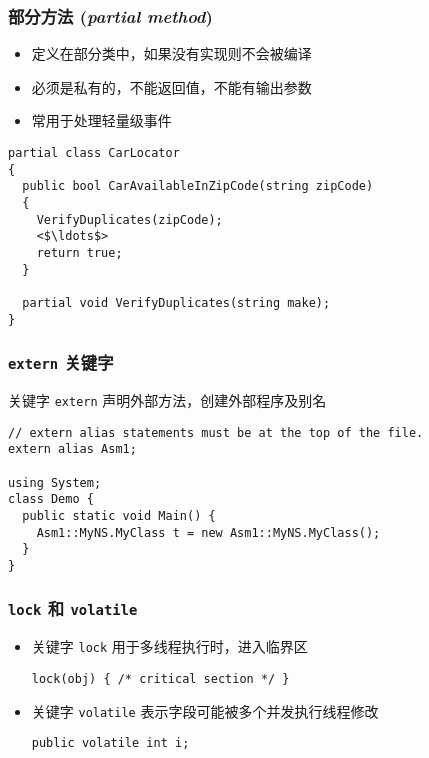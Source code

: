 \begin{frame}[fragile]
\frametitle{部分方法 (\textit{partial method})}
\begin{itemize}
\item 定义在部分类中，如果没有实现则不会被编译
\item 必须是私有的，不能返回值，不能有输出参数
\item 常用于处理轻量级事件
\end{itemize}
\begin{lstlisting}[escapeinside=<>]
partial class CarLocator
{
  public bool CarAvailableInZipCode(string zipCode)
  {
    VerifyDuplicates(zipCode);
    <$\ldots$>
    return true;
  }

  partial void VerifyDuplicates(string make);
}
\end{lstlisting}
\end{frame}


\begin{frame}[fragile]
\frametitle{\texttt{extern} 关键字}
关键字 \texttt{extern} 声明外部方法，创建外部程序及别名

\begin{lstlisting}
// extern alias statements must be at the top of the file.
extern alias Asm1;

using System;
class Demo {
  public static void Main() {
    Asm1::MyNS.MyClass t = new Asm1::MyNS.MyClass();
  }
}
\end{lstlisting}

\end{frame}

\begin{frame}[fragile]
\frametitle{\texttt{lock} 和 \texttt{volatile}}
\begin{itemize}
\item 关键字 \texttt{lock} 用于多线程执行时，进入临界区
\begin{lstlisting}
lock(obj) { /* critical section */ }
\end{lstlisting}
\item 关键字 \texttt{volatile} 表示字段可能被多个并发执行线程修改
\begin{lstlisting}
public volatile int i;
\end{lstlisting}
\end{itemize}
\end{frame}


